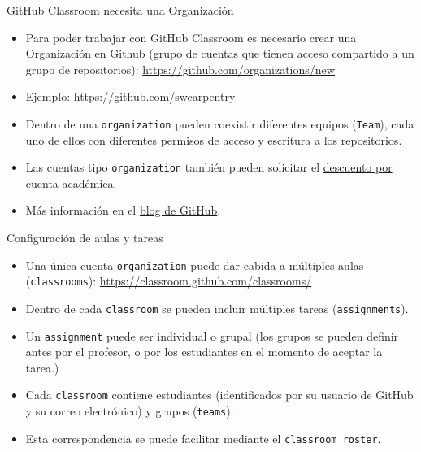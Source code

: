\documentclass[xcolor={usenames,svgnames,dvipsnames}]{beamer}
\begin{document}
\begin{frame}[label={sec:orgfee8f47},fragile]{GitHub Classroom necesita una Organización}
 \begin{itemize}
\item Para poder trabajar con GitHub Classroom es necesario crear una Organización en Github (grupo de cuentas que tienen acceso compartido a un grupo de repositorios): \url{https://github.com/organizations/new}

\item Ejemplo: \url{https://github.com/swcarpentry}

\item Dentro de una \texttt{organization} pueden coexistir diferentes equipos (\texttt{Team}), cada uno de ellos con diferentes permisos de acceso y escritura a los repositorios.

\item Las cuentas tipo \texttt{organization} también pueden solicitar el \href{https://help.github.com/en/articles/applying-for-an-educator-or-researcher-discount\#upgrading-your-organization}{descuento por cuenta académica}.

\item Más información en el \href{https://github.blog/2010-06-29-introducing-organizations/}{blog de GitHub}.
\end{itemize}
\end{frame}

\begin{frame}[label={sec:org7ed5c64},fragile]{Configuración de aulas y tareas}
 \begin{itemize}
\item Una única cuenta \texttt{organization} puede dar cabida a múltiples aulas (\texttt{classrooms}): \url{https://classroom.github.com/classrooms/}
\item Dentro de cada \texttt{classroom} se pueden incluir múltiples tareas (\texttt{assignments}).
\item Un \texttt{assignment} puede ser individual o grupal (los grupos se pueden definir antes por el profesor, o por los estudiantes en el momento de aceptar la tarea.)
\item Cada \texttt{classroom} contiene estudiantes (identificados por su usuario de GitHub y su correo electrónico) y grupos (\texttt{teams}).
\item Esta correspondencia se puede facilitar mediante el \texttt{classroom roster}.
\end{itemize}
\end{frame}
\end{document}
